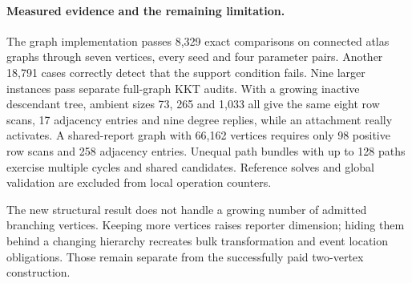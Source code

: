 \paragraph{Measured evidence and the remaining limitation.}
The graph implementation passes 8,329 exact comparisons on connected atlas
graphs through seven vertices, every seed and four parameter pairs. Another
18,791 cases correctly detect that the support condition fails. Nine larger
instances pass separate full-graph KKT audits. With a growing inactive
descendant tree, ambient sizes 73, 265 and 1,033 all give the same eight
row scans, 17 adjacency entries and nine degree replies, while an attachment
really activates. A shared-report graph with 66,162 vertices requires only
98 positive row scans and 258 adjacency entries. Unequal path bundles with
up to 128 paths exercise multiple cycles and shared candidates. Reference
solves and global validation are excluded from local operation counters.

The new structural result does not handle a growing number of admitted
branching vertices. Keeping more vertices raises reporter dimension; hiding
them behind a changing hierarchy recreates bulk transformation and event
location obligations. Those remain separate from the successfully paid
two-vertex construction.
